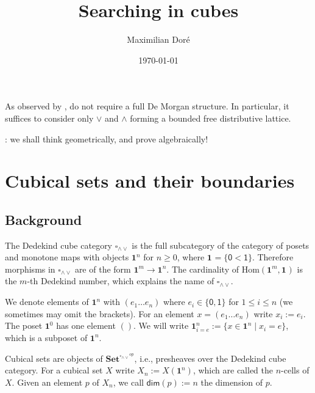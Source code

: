 \documentclass[11pt]{article}
\title{Searching in cubes}
\author{Maximilian Dor\'e}
\date{\today}
\theoremstyle{definition}
\newcommand{\mdef}{:=}
\newcommand{\join}{\wedge}
\newcommand{\meet}{\vee}
\newcommand{\dedekind}{\square_{\join \meet}}
\newcommand{\pint}[1]{\mathbf{1}^{#1}}
\newcommand{\pintrestr}[3]{\mathbf{1}^{#1}_{{#2}={#3}}}
\newcommand{\izero}{\mathsf{0}}
\newcommand{\ione}{\mathsf{1}}
\newcommand{\restrict}[2]{{#1}|_{#2}}
\newcommand{\psh}[1]{\mathbf{Set}^{{#1}^{op}}}
\renewcommand{\hom}[2]{\text{Hom}({#1} , {#2})}
\renewcommand{\dim}[1]{\mathsf{dim}({#1})}
\begin{document}
\maketitle	

As observed by \cite{orton17_axiom_model_cubic_type_theor_topos}, do not require
a full De Morgan structure. In particular, it suffices to consider only $\meet$
and $\join$ forming a bounded free distributive lattice.

\cite{williamson12_combin_homot_theor}: we shall think geometrically, and prove
algebraically!



\section{Cubical sets and their boundaries}

\subsection{Background}

The Dedekind cube category $\dedekind$ is the full subcategory of the category
of posets and monotone maps with objects $\pint{n}$ for $n \geq 0$, where $\pint{}
= \{ \izero < \ione \}$. Therefore morphisms in $\dedekind$ are of
the form $\pint{m} \to \pint{n}$. The cardinality of $\hom{\pint{m}}{\pint{}}$ is the
$m$-th Dedekind number, which explains the name of $\dedekind$.

We denote elements of $\pint{n}$ with $(e_1 \ldots e_n)$ where $e_i \in
\{\izero, \ione\}$ for $1 \leq i \leq n$ (we sometimes may omit the brackets).
For an element $x = (e_1 \ldots e_n)$ write $x_i \mdef e_i$. The poset
$\pint{0}$ has one element $()$. We will write $\pintrestr{n}{i}{e} \mdef
\{ x \in \pint{n} \mid x_i = e \}$, which is a subposet of $\pint{n}$.




Cubical sets are objects of $\psh{\dedekind}$, i.e., presheaves over the
Dedekind cube category. For a cubical set $X$ write $X_n \mdef X(\pint{n})$,
which are called the $n$-cells of $X$. Given an element $p$ of $X_n$, we call
$\dim{p} \mdef n$ the dimension of $p$.
\end{document}
